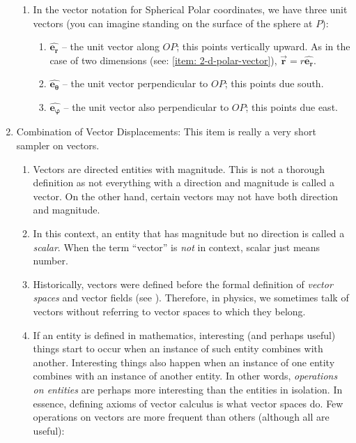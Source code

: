 \documentclass[12pt,a4paper]{book}
\newcommand{\vect}[1]{\pmb{\vec{#1}}}
\newcommand{\uvec}[1]{\pmb{\hat{#1}}}
\begin{document}
\begin{enumerate}
\begin{enumerate}
            \item In the vector notation for Spherical Polar coordinates, we have three unit vectors (you can imagine standing on the surface of the sphere at $P$):
                \begin{enumerate}
                    \item $\uvec{e_r}$ -- the unit vector along $OP$; this points vertically upward. As in the case of two dimensions (see: \ref{item: 2-d-polar-vector}), $\vect{r} = r\uvec{e_r}$.
                    \item $\uvec{e_\theta}$ -- the unit vector perpendicular to $OP$; this points due south.
                    \item $\uvec{e_\varphi}$ -- the unit vector also perpendicular to $OP$; this points due east.
                \end{enumerate}
        \end{enumerate}
    \item Combination of Vector Displacements: This item is really a very short sampler on vectors.
        \begin{enumerate}
            \item Vectors are directed entities with magnitude. This is not a thorough definition as not everything with a direction and magnitude is called a vector. On the other hand, certain vectors may not have both direction and magnitude.
            \item In this context, an entity that has magnitude but no direction is called a \emph{scalar}. When the term ``vector'' is \emph{not} in context, scalar just means number.
            \item Historically, vectors were defined before the formal definition of \emph{vector spaces} and vector fields (see \cite{vector-wikipedia}). Therefore, in physics, we sometimes talk of vectors without referring to vector spaces to which they belong.
            \item If an entity is defined in mathematics, interesting (and perhaps useful) things start to occur when an instance of such entity combines with another. Interesting things also happen when an instance of one entity combines with an instance of another entity. In other words, \emph{operations on entities} are perhaps more interesting than the entities in isolation. In essence, defining axioms of vector calculus is what vector spaces do. Few operations on vectors are more frequent than others (although all are useful):
                \begin{enumerate}

\end{enumerate}
\end{enumerate}
\end{enumerate}
\end{document}
